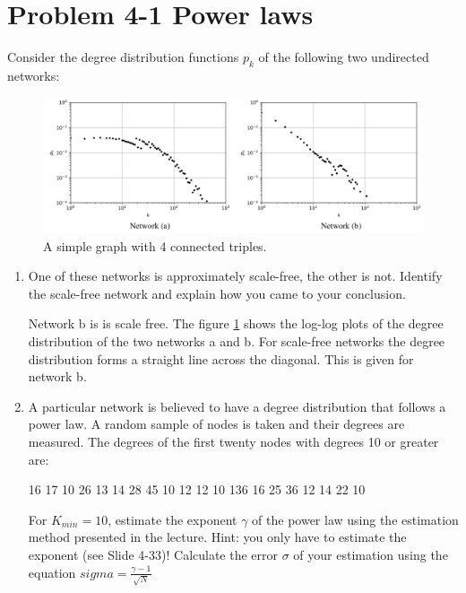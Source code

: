 \section{Problem 4-1 Power laws}

Consider the degree distribution functions $p_k$ of the following two undirected networks:

\begin{figure}[h]
	\centering
	\includegraphics[width=0.9\linewidth]{images/problem41_degree_distribution_networks.png}
	\caption{A simple graph with 4 connected triples.}
	\label{distribution}
\end{figure}

\begin{enumerate}
	\item One of these networks is approximately scale-free, the other is not. Identify the scale-free network and explain how you came to your conclusion.
	
	Network b is is scale free. 
	The figure \ref{distribution} shows the log-log plots of the degree distribution of the two networks a and b. For scale-free networks the degree distribution forms a straight line across the diagonal. This is given for network b.
	
	\item A particular network is believed to have a degree distribution that follows a power law. A random sample of nodes is taken and their degrees are measured. The degrees of the first twenty nodes with degrees 10 or greater are: 
	
	16  17  10  26  13  14  28  45  10  12
	12  10  136  16  25  36  12  14  22  10
	
	For $K_{min} = 10$, estimate the exponent $\gamma$ of the power law using the estimation method presented in the lecture.
	Hint: you only have to estimate the exponent (see Slide 4-33)!
	Calculate the error $\sigma$ of your estimation using the equation $sigma = \frac{\gamma - 1}{\sqrt{N}}$

\end{enumerate}